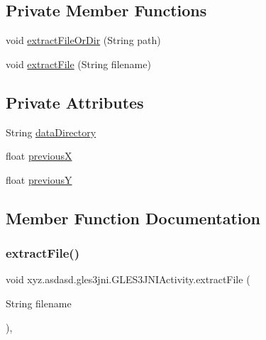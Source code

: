 \subsection*{Private Member Functions}
\begin{DoxyCompactItemize}
\item 
void \hyperlink{classxyz_1_1asdasd_1_1gles3jni_1_1_g_l_e_s3_j_n_i_activity_a9c5e73ce57d6870b0be7df388d7f6402}{extract\+File\+Or\+Dir} (String path)
\item 
void \hyperlink{classxyz_1_1asdasd_1_1gles3jni_1_1_g_l_e_s3_j_n_i_activity_a6cfc20e825890032cc9e9d709b82611f}{extract\+File} (String filename)
\end{DoxyCompactItemize}
\subsection*{Private Attributes}
\begin{DoxyCompactItemize}
\item 
String \hyperlink{classxyz_1_1asdasd_1_1gles3jni_1_1_g_l_e_s3_j_n_i_activity_a96392777a8192c64350959f1d1a615f6}{data\+Directory}
\item 
float \hyperlink{classxyz_1_1asdasd_1_1gles3jni_1_1_g_l_e_s3_j_n_i_activity_a871ed0cfe209b24c1fadbe0e5e61b9da}{previousX}
\item 
float \hyperlink{classxyz_1_1asdasd_1_1gles3jni_1_1_g_l_e_s3_j_n_i_activity_a404f83a04f746c84f6bb89251999b135}{previousY}
\end{DoxyCompactItemize}


\subsection{Member Function Documentation}
\mbox{\label{classxyz_1_1asdasd_1_1gles3jni_1_1_g_l_e_s3_j_n_i_activity_a6cfc20e825890032cc9e9d709b82611f}} 
\subsubsection{\texorpdfstring{extract\+File()}{extractFile()}}
{\footnotesize\ttfamily void xyz.\+asdasd.\+gles3jni.\+G\+L\+E\+S3\+J\+N\+I\+Activity.\+extract\+File (\begin{DoxyParamCaption}\item[{String}]{filename }\end{DoxyParamCaption})\hspace{0.3cm}{\ttfamily [inline]}, {\ttfamily [private]}}

